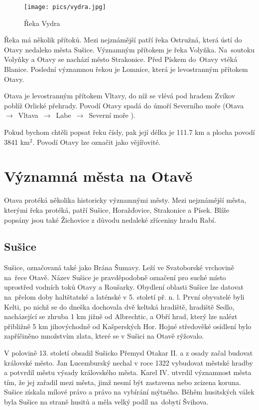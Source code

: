 \documentclass[thesis=M,czech]{FITthesis}[2012/06/26]
\begin{document}
\begin{figure}[h!]
	\centering
	\texttt{[image: pics/vydra.jpg]}
	\caption{Řeka Vydra}
	\label{obrazek:ot1}
\end{figure}

Řeka má několik přítoků. Mezi nejznámější patří řeka Ostružná, která ústí do Otavy nedaleko města Sušice. Významným přítokem je řeka Volyňka. Na~soutoku Volyňky a Otavy se nachází město Strakonice. Před Pískem do~Otavy vtéká Blanice. Poslední významnou řekou je Lomnice, která je levostranným přítokem Otavy. 

Otava je levostranným přítokem Vltavy, do níž se vlévá pod hradem Zvíkov poblíž Orlické přehrady. Povodí Otavy spadá do úmoří Severního moře (Otava~$\rightarrow$~Vltava~$\rightarrow$~Labe~$\rightarrow$~Severní moře ). 

Pokud bychom chtěli popsat řeku čísly, pak její délka je 111.7 km a plocha povodí 3841 km$^2$. Povodí Otavy lze označit jako vějířovité. 

\clearpage

\section{Významná města na Otavě}
Otava protéká několika historicky významnými městy. Mezi nejznámější města, kterými řeka protéká, patří Sušice, Horažďovice, Strakonice a Písek. Blíže popsány jsou také Žichovice z důvodu nedaleké zříceniny hradu Rabí.

\subsection{Sušice}
Sušice, označovaná také jako Brána Šumavy. Leží ve Svatoborské vrchovině na~řece Otavě. Název Sušice je pravděpodobně označení pro suché místo uprostřed vodních toků Otavy a Roušarky. Obydlení oblasti Sušice lze datovat na~přelom doby haltštatské a laténské v 5. století př. n. l. První obyvatelé byli Kelti, po nichž se do dneška dochovala dvě keltská hradiště, hradiště Sedlo, nacházející se zhruba 1 km jižně od Albrechtic, a Obří hrad, který lze nalézt přibližně 5 km jihovýchodně od Kašperských Hor. Hojné středověké osídlení bylo zapříčiněno množstvím zlata, které se v Sušici na Otavě rýžovalo. 

V polovině 13. století obsadil Sušicko Přemysl Otakar II. a z osady začal budovat královské město. Jan Lucemburský nechal v roce 1322 vybudovat městské hradby a potvrdil městu výsady královského města. Karel IV. utvrdil významnost města tím, že jej zařadil mezi města, jimž nesmí být zastavena nebo zcizena koruna. Sušice získala mílové právo a právo na vybírání mýtného. Běhěm husitských válek byla Sušice na straně husitů a měla velký podíl na~dobytí Švihova. 
\end{document}

